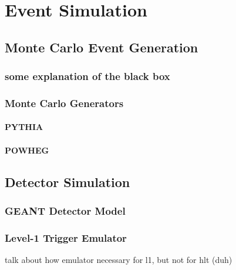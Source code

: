 \chapter{Event Simulation}

\section{Monte Carlo Event Generation}
\subsection{some explanation of the black box}
\subsection{Monte Carlo Generators}
\subsubsection{PYTHIA}
\subsubsection{POWHEG}

\section{Detector Simulation}
\subsection{GEANT Detector Model}

\subsection{Level-1 Trigger Emulator}
talk about how emulator necessary for l1, but not for hlt (duh)
